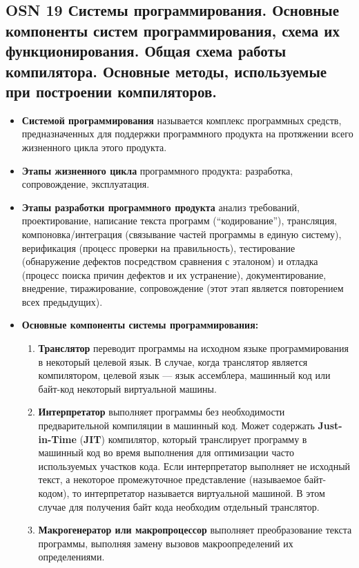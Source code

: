 \subsection*{OSN 19 Системы программирования. Основные компоненты систем программирования, схема их функционирования. Общая схема работы компилятора. Основные методы, используемые при построении компиляторов.}

\begin{itemize}
    \item \textbf{Системой программирования} называется комплекс программных средств, предназначенных для поддержки программного продукта на протяжении всего жизненного цикла этого продукта.
    \item \textbf{Этапы жизненного цикла} программного продукта: разработка, сопровождение, эксплуатация.
    \item \textbf{Этапы разработки программного продукта}
        анализ требований,
        проектирование,
        написание текста программ (``кодирование''),
        трансляция, компоновка/интеграция (связывание частей программы в единую систему),
        верификация (процесс проверки на правильность), тестирование (обнаружение дефектов посредством сравнения с эталоном) и отладка (процесс поиска причин дефектов и их устранение),
        документирование,
        внедрение,
        тиражирование,
        сопровождение (этот этап является повторением всех предыдущих).
    \item \textbf{Основные компоненты системы программирования:}
    \begin{enumerate}
        \item \textbf{Транслятор} переводит программы на исходном языке программирования в некоторый целевой язык.
        В случае, когда транслятор является компилятором, целевой язык --- язык ассемблера, машинный код или байт-код некоторый виртуальной машины.
        \item \textbf{Интерпретатор} выполняет программы без необходимости предварительной компиляции в машинный код.
        Может содержать \textbf{Just-in-Time} (\textbf{JIT}) компилятор, который транслирует программу в машинный код во время выполнения для оптимизации часто используемых участков кода.
        Если интерпретатор выполняет не исходный текст, а некоторое промежуточное представление (называемое байт-кодом), то интерпретатор называется виртуальной машиной.
        В этом случае для получения байт кода необходим отдельный транслятор.
        \item \textbf{Макрогенератор или макропроцессор} выполняет преобразование текста программы, выполняя замену вызовов макроопределений их определениями.

\end{enumerate}
\end{itemize}
